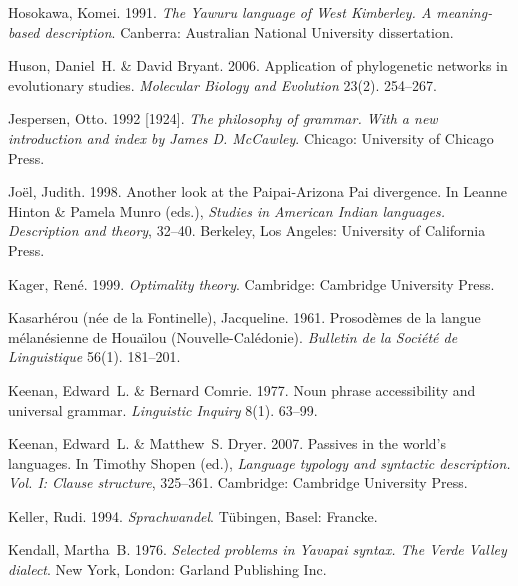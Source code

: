 \documentclass[ number=1
			   ,series=sidl
				,url=http://langsci-press.org/catalog/book/18 
			   ,isbn=978-3-944675-19-0
			   ,output=long   %
			  ]{LSP/langsci}
\begin{document}
\begin{thebibliography}{190}
Hosokawa, Komei. 1991.
\newblock \emph{The {Y}awuru language of {W}est {K}imberley. {A} meaning-based
  description}.
\newblock Canberra: Australian National University dissertation.

Huson, Daniel~H. \& David Bryant. 2006.
\newblock Application of phylogenetic networks in evolutionary studies.
\newblock \emph{Molecular Biology and Evolution} 23(2). 254--267.

Jespersen, Otto. 1992 [1924].
\newblock \emph{The philosophy of grammar. {W}ith a new introduction and index
  by {J}ames {D.} {McCawley}}.
\newblock Chicago: University of Chicago Press.

Jo{\"e}l, Judith. 1998.
\newblock Another look at the {P}aipai-{A}rizona {P}ai divergence.
\newblock In Leanne Hinton \& Pamela Munro (eds.), \emph{Studies in {A}merican
  {I}ndian languages. {D}escription and theory}, 32--40. Berkeley, Los Angeles:
  University of California Press.

Kager, Ren{\'e}. 1999.
\newblock \emph{Optimality theory}.
\newblock Cambridge: Cambridge University Press.

{Kasarh{\'e}rou (n{\'e}e de la Fontinelle)}, Jacqueline. 1961.
\newblock Prosod{\`e}mes de la langue m{\'e}lan{\'e}sienne de {H}oua{\"\i}lou
  ({N}ouvelle-{C}al{\'e}donie).
\newblock \emph{Bulletin de la Soci{\'e}t{\'e} de Linguistique} 56(1).
  181--201.

Keenan, Edward~L. \& Bernard Comrie. 1977.
\newblock Noun phrase accessibility and universal grammar.
\newblock \emph{Linguistic Inquiry} 8(1). 63--99.

Keenan, Edward~L. \& Matthew~S. Dryer. 2007.
\newblock Passives in the world's languages.
\newblock In Timothy Shopen (ed.), \emph{Language typology and syntactic
  description. {V}ol. {I}: {C}lause structure}, 325--361. Cambridge: Cambridge
  University Press.

Keller, Rudi. 1994.
\newblock \emph{Sprachwandel}.
\newblock T{\"u}bingen, Basel: Francke.

Kendall, Martha~B. 1976.
\newblock \emph{Selected problems in {Y}avapai syntax. {T}he {V}erde {V}alley
  dialect}.
\newblock New York, London: Garland Publishing Inc.


\end{thebibliography}
\end{document}

